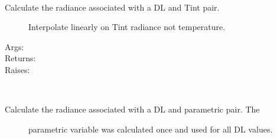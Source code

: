 \documentclass[a4paper,10pt,english]{sphinxmanual}
\begin{document}
\begin{fulllineitems}
\begin{fulllineitems}
\end{fulllineitems}


\begin{fulllineitems}
\label{rylookup:pyradi.rylookup.RadLookup.LookupDLRad}~\begin{description}
\item[{Calculate the radiance associated with a DL and Tint pair.}] \leavevmode
Interpolate linearly on Tint radiance not temperature.

\item[{Args:}] \leavevmode
{}

\item[{Returns:}] \leavevmode
{}

\item[{Raises:}] \leavevmode
{}

\end{description}

\end{fulllineitems}


\begin{fulllineitems}
\label{rylookup:pyradi.rylookup.RadLookup.LookupDLRadHelper}~\begin{description}
\item[{Calculate the radiance associated with a DL and parametric pair. The}] \leavevmode
parametric variable was calculated once and used for all DL values.


\end{description}
\end{fulllineitems}
\end{fulllineitems}
\end{document}
